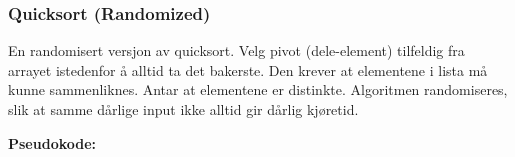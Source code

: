\documentclass[12pt]{report}
\begin{document}
\vspace{\baselineskip}

\vspace{\baselineskip}

\vspace{\baselineskip}

\vspace{\baselineskip}



\newpage

\vspace{\baselineskip}\setlength{\parskip}{6.0pt}
\subsubsection*{Quicksort (Randomized)}

\vspace{\baselineskip}
En randomisert versjon av quicksort. Velg pivot (dele-element) tilfeldig fra arrayet istedenfor å alltid ta det bakerste. Den krever at elementene i lista må kunne sammenliknes. Antar at elementene er distinkte. Algoritmen randomiseres, slik at samme dårlige input ikke alltid gir dårlig kjøretid. \par


\vspace{\baselineskip}

\vspace{\baselineskip}
\textbf{Pseudokode:}\par
\end{document}
